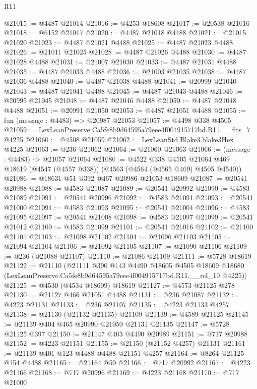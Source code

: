 \begin{lexlean}{R11}
\begin{coremodule}
@21015 := @4487 @21014
@21016 := @4253 @18608
@21017 := @20538 @21016
@21018 := @6152 @21017
@21020 := @4487 @21018 @4488
@21021 := @21015 @21020
@21023 := @4487 @21021 @4488
@21025 := @4487 @21023 @4488
@21026 := @21011 @21025
@21028 := @4487 @21026 @4488
@21030 := @4487 @21028 @4488
@21031 := @21007 @21030
@21033 := @4487 @21031 @4488
@21035 := @4487 @21033 @4488
@21036 := @21003 @21035
@21038 := @4487 @21036 @4488
@21040 := @4487 @21038 @4488
@21041 := @20999 @21040
@21043 := @4487 @21041 @4488
@21045 := @4487 @21043 @4488
@21046 := @20995 @21045
@21048 := @4487 @21046 @4488
@21050 := @4487 @21048 @4488
@21051 := @20991 @21050
@21053 := @4487 @21051 @4488
@21055 := fun (message : @4483) => @20987 @21053
@21057 := @4498 @338 @4505
@21059 := LexLeanPreserve.Ca5fe8b9d64595a79eee4f004915717bd.R11.__fits_7 @4225
@21060 := @4508 @21059
@21062 := LexLeanStd.Blake3.blake3Hex @4225
@21063 := @236 @21062
@21064 := @21060 @21063
@21066 := (message : @4483) -> @21057 @21064
@21080 := @4522
    @338
    @4505
    @21064
    @469
    @18619
    (@4547 (@4557 @338))
    (@4563 (@4564 (@4565 @469) @4505 @4540))
@21086 := @18631 @51 @392 @467 @20986 @21053 @18609
@21087 := @20541 @20988
@21088 := @4583 @21087
@21089 := @20541 @20992
@21090 := @4583 @21089
@21091 := @20541 @20996
@21092 := @4583 @21091
@21093 := @20541 @21000
@21094 := @4583 @21093
@21095 := @20541 @21004
@21096 := @4583 @21095
@21097 := @20541 @21008
@21098 := @4583 @21097
@21099 := @20541 @21012
@21100 := @4583 @21099
@21101 := @20541 @21016
@21102 := @21100 @21101
@21103 := @21098 @21102
@21104 := @21096 @21103
@21105 := @21094 @21104
@21106 := @21092 @21105
@21107 := @21090 @21106
@21109 := @236 (@21088 @21107)
@21110 := @21086 @21109
@21111 := @5728 @18619
@21122 := @21110
    (@21111
      @390
      @143
      @4490
      @18605
      @4505
      @18609
      @18680
      (LexLeanPreserve.Ca5fe8b9d64595a79eee4f004915717bd.R11.__rel_10 @4225))
@21125 := @4530 (@4534 @18609) @18619
@21127 := @4573 @21125 @278
@21130 := @21127 @466 @21051 @4488
@21131 := @236 @21087
@21132 := @4223 @21131
@21133 := @236 @21107
@21135 := @4223 @21133 @4257
@21138 := @21130 (@21132 @21135) @21109
@21139 := @4589 @21125
@21145 := @21139 @404 @465 @20990 @21050 @21131 @21135
@21147 := @5728 @21125 @397
@21150 := @21147 @403 @4490 @20989
@21151 := @717 @20988
@21152 := @4223 @21151
@21155 := @21150 (@21152 @4257) @21131
@21161 := @21139 @401 @123 @4488 @4488 @21151 @4257
@21164 := @8264 @21125 @154 @4488
@21165 := @21164 @50
@21166 := @717 @20992
@21167 := @4223 @21166
@21168 := @717 @20996
@21169 := @4223 @21168
@21170 := @717 @21000

\end{coremodule}
\end{lexlean}
